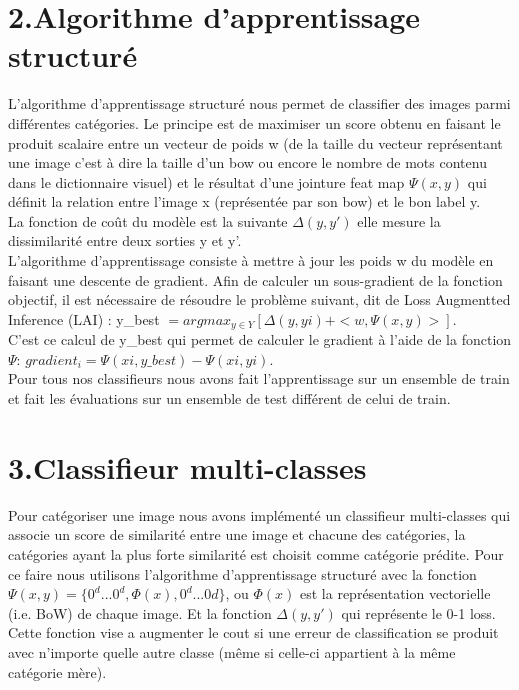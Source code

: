 \documentclass[a4paper,11pt]{report}
\begin{document}
\section*{2.Algorithme d'apprentissage structuré}
L'algorithme d'apprentissage structuré nous permet de classifier des images parmi différentes catégories. Le principe est de maximiser un score obtenu en faisant le produit scalaire entre un vecteur de poids w (de la taille du vecteur représentant une image c'est à dire la taille d'un bow ou encore le nombre de mots contenu dans le dictionnaire visuel) et le résultat d'une jointure feat map $\Psi(x,y)$ qui définit la relation entre l'image x (représentée par son bow) et le bon label y.\\ La fonction de coût du modèle est la suivante $\Delta(y,y')$ elle mesure la dissimilarité entre deux sorties y et y'.\\
L'algorithme d'apprentissage consiste à mettre à jour les poids w du modèle en faisant une descente de gradient. Afin de calculer un sous-gradient de la fonction objectif, il est nécessaire de résoudre le problème suivant, dit de Loss Augmentted Inference (LAI) : y\_best $= arg max_{y \in Y} [ \Delta(y, yi) + <w, \Psi(x, y)>]$.\\ 
C'est ce calcul de y\_best qui permet de calculer le gradient à l'aide de la fonction $\Psi$:
$gradient_i= \Psi(xi, y\_best) - \Psi (xi,yi)$.\\
Pour tous nos classifieurs nous avons fait l'apprentissage sur un ensemble de train et fait les évaluations sur un ensemble de test différent de celui de train.


\section*{3.Classifieur multi-classes}
Pour catégoriser une image nous avons implémenté un classifieur multi-classes qui associe un score de similarité entre une image et chacune des catégories, la catégories ayant la plus forte similarité est choisit comme catégorie prédite. Pour ce faire nous utilisons l'algorithme d'apprentissage structuré avec la fonction $\Psi(x,y)=\{  0^d...0^d, \Phi(x), 0^d...0d \}$, ou $\Phi(x)$ est la représentation vectorielle (i.e. BoW) de chaque image. Et la fonction $\Delta(y,y')$ qui représente le 0-1 loss. Cette fonction vise a augmenter le cout si une erreur de classification se produit avec  n'importe quelle autre classe (même si celle-ci appartient à la même catégorie mère).
\end{document}

